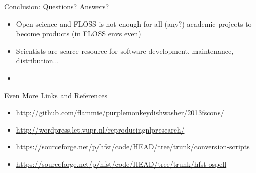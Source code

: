 \documentclass[t,12pt]{beamer}
\begin{document}
\begin{frame}{Conclusion: Questions? Answers?}
    \begin{itemize}
        \item Open science and FLOSS is not enough for all (any?) academic
            projects to become products (in FLOSS envs even)
        \item Scientists are scarce resource for software development,
            maintenance, distribution...
        \item
    \end{itemize}
\end{frame}

\begin{frame}{Even More Links and References}
    \begin{itemize}
        \item \url{http://github.com/flammie/purplemonkeydishwasher/2013fscons/}
        \item \url{http://wordpress.let.vupr.nl/reproducingnlpresearch/}
        \item \url{https://sourceforge.net/p/hfst/code/HEAD/tree/trunk/conversion-scripts}
        \item \url{https://sourceforge.net/p/hfst/code/HEAD/tree/trunk/hfst-ospell}
    \end{itemize}
\end{frame}
\end{document}
